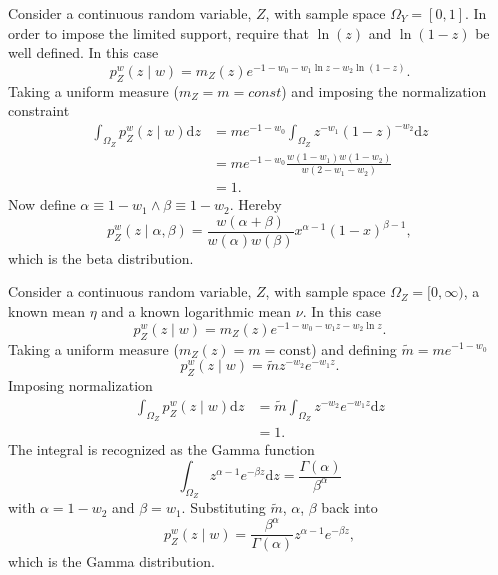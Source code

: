 \begin{example}
	Consider a continuous random variable, $Z$, with sample space $\Omega_Y =[0,1]$. In order to impose the limited support, require that $\ln(z)$ and $\ln(1-z)$ be well defined. In this case
	\begin{equation}
		p_{Z}^w(z\mid w)=m_Z(z)e^{-1-w_0-w_1\ln z-w_2\ln(1-z)}.
	\end{equation}
	Taking a uniform measure ($m_Z=m= const$) and imposing the normalization constraint
	\begin{equation}
		\begin{split}
			\int_{\Omega_Z} p_{Z}^w(z\mid w) \mathrm{d}z &= me^{-1-w_0}\int_{\Omega_Z} z^{-w_1}(1-z)^{-w_2}\mathrm{d}z\\
			&= me^{-1-w_0}\frac{w(1-w_1)w(1-w_2)}{w(2-w_1-w_2)}\\
			&=1.
		\end{split}
	\end{equation}
	Now define $\alpha \equiv 1-w_1\wedge \beta \equiv 1-w_2$. Hereby
	\begin{equation}
		p_{Z}^w(z\mid \alpha,\beta) = \frac{w(\alpha+\beta)}{w(\alpha)w(\beta)}x^{\alpha-1}(1-x)^{\beta-1},
	\end{equation}
	which is the beta distribution. 
\end{example}


\begin{example}
	Consider a continuous random variable, $Z$, with sample space $\Omega_Z= [0,\infty)$, a known mean $\eta$ and a known logarithmic mean $\nu$. In this case
	\begin{equation}
			p_{Z}^w(z \mid w)= m_Z(z) e^{-1-w_0 - w_1 z - w_2 \ln z}.
		\label{eq:gam1}
	\end{equation}
	Taking a uniform measure ($m_Z(z) = m= \text{const}$) and defining $\tilde{m} = m e^{-1-w_0}$
	\begin{equation}
				p_{Z}^w(z \mid w) = \tilde{m} z^{-w_2} e^{-w_1 z}.
	\end{equation}
	Imposing normalization
	\begin{equation}
		\begin{split}
			\int_{\Omega_Z} p_{Z}^w(z \mid w) \mathrm{d}z &= \tilde{m} \int_{\Omega_Z} z^{-w_2} e^{-w_1 z} \mathrm{d}z\\
			& = 1.
		\end{split}
	\end{equation}
	The integral is recognized as the Gamma function
	\begin{equation}
		\int_{\Omega_Z} z^{\alpha-1}  e^{-\beta z} \mathrm{d}z = \frac{\Gamma(\alpha)}{\beta^\alpha}
	\end{equation}
	with $\alpha = 1 - w_2$ and $\beta = w_1$. Substituting $\tilde{m}$, $\alpha$, $\beta$ back into 
	\begin{equation}
		p_{Z}^w(z \mid w) = \frac{\beta^\alpha}{\Gamma(\alpha)} z^{\alpha-1} e^{-\beta z},
	\end{equation}
	which is the Gamma distribution.
\end{example}

